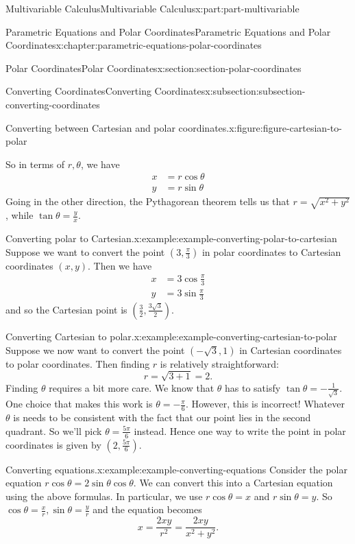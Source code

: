 \documentclass[twoside,10pt,]{tufte-book}
\numberwithin{equation}{part}
\newcommand{\amp}{&}
\begin{document}
\begin{partptx}{Multivariable Calculus}{}{Multivariable Calculus}{}{}{x:part:part-multivariable}
\begin{chapterptx}{Parametric Equations and Polar Coordinates}{}{Parametric Equations and Polar Coordinates}{}{}{x:chapter:parametric-equations-polar-coordinates}
\begin{sectionptx}{Polar Coordinates}{}{Polar Coordinates}{}{}{x:section:section-polar-coordinates}
\begin{subsectionptx}{Converting Coordinates}{}{Converting Coordinates}{}{}{x:subsection:subsection-converting-coordinates}
\begin{figureptx}{Converting between Cartesian and polar coordinates.}{x:figure:figure-cartesian-to-polar}{}
\begin{image}{0}{1}{0}
{\begin{tikzpicture}
\end{tikzpicture}
}%
\end{image}%
\tcblower
\end{figureptx}%
So in terms of \(r,\theta\), we have%
%
\begin{align*}
x \amp = r\cos\theta \\
y \amp = r\sin\theta 
\end{align*}
Going in the other direction, the Pythagorean theorem tells us that \(r = \sqrt{x^{2}+y^{2}}\), while \(\tan\theta = \frac{y}{x}\).%
\begin{example}{Converting polar to Cartesian.}{x:example:example-converting-polar-to-cartesian}%
Suppose we want to convert the point \((3,\frac{\pi}{3})\) in polar coordinates to Cartesian coordinates \((x,y)\). Then we have%
%
\begin{align*}
x \amp = 3\cos\frac{\pi}{3} \\
y \amp = 3\sin\frac{\pi}{3} 
\end{align*}
and so the Cartesian point is \((\frac{3}{2},\frac{3\sqrt{3}}{2}).\)%
\end{example}
\begin{example}{Converting Cartesian to polar.}{x:example:example-converting-cartesian-to-polar}%
Suppose we now want to convert the point \((-\sqrt{3},1)\) in Cartesian coordinates to polar coordinates. Then finding \(r\) is relatively straightforward:%
%
\begin{equation*}
r = \sqrt{3+1} = 2.
\end{equation*}
Finding \(\theta\) requires a bit more care. We know that \(\theta\) has to satisfy \(\tan\theta = -\frac{1}{\sqrt{3}}\). One choice that makes this work is \(\theta = -\frac{\pi}{6}\). However, this is incorrect! Whatever \(\theta\) is needs to be consistent with the fact that our point lies in the second quadrant. So we'll pick \(\theta = \frac{5\pi}{6}\) instead. Hence one way to write the point in polar coordinates is given by \((2,\frac{5\pi}{6}).\)%
\end{example}
\begin{example}{Converting equations.}{x:example:example-converting-equations}%
Consider the polar equation \(r\cos\theta = 2\sin\theta\cos\theta\). We can convert this into a Cartesian equation using the above formulas. In particular, we use \(r\cos\theta = x\) and \(r\sin\theta = y\). So \(\cos\theta = \frac{x}{r}, \sin\theta = \frac{y}{r}\) and the equation becomes%
%
\begin{equation*}
x = \frac{2xy}{r^{2}} = \frac{2xy}{x^{2}+y^{2}}.

\end{equation*}
\end{example}
\end{subsectionptx}
\end{sectionptx}
\end{chapterptx}
\end{partptx}
\end{document}
